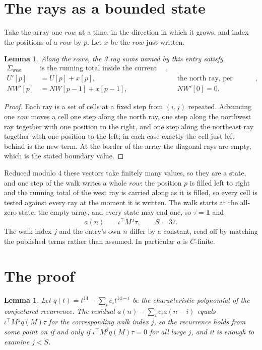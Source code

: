 \documentclass[11pt,a4paper]{article}
\theoremstyle{plain}
\newtheorem{lemma}[theorem]{Lemma}
\theoremstyle{definition}
\begin{document}
\section{The rays as a bounded state}

Take the array one $row$ at a time, in the direction in which it grows, and index the
positions of a $row $ by $p$. Let $x$ be the $row$ just written.

\begin{lemma}\label{lem:rays}
Along the $row$s, the 3 ray sums named by this entry satisfy
\[
\begin{aligned}
\Sigma_{\mathrm{west}}\ &\text{is the running total inside the current row},\\
U'[p]&=U[p]+x[p], &&\text{the north ray, per position},\\
NW'[p]&=NW[p-1]+x[p-1], && NW'[0]=0 .
\end{aligned}
\]
\end{lemma}

\begin{proof}
Each ray is a set of cells at a fixed step from $(i,j)$ repeated. Advancing one $row$
moves a cell one step along the north ray, one step along the northwest ray together with one
position to the right, and one step along the northeast ray together with one position to the
left; in each case exactly the cell just left behind is the new term. At the border of the
array the diagonal rays are empty, which is the stated boundary value.
\end{proof}

Reduced modulo $4$ these vectors take finitely many values, so they are a state, and one step
of the walk writes a whole $row$: the position $p$ is filled left to right and the
running total of the west ray is carried along as it is filled, so every cell is tested
against every ray at the moment it is written. The walk starts at the all-zero state, the empty
array, and every state may end one, so $\tau=\mathbf{1}$ and
\[
a(n)\;=\;\iota^{\!\top}M^{\,j}\tau ,\qquad S=37.
\]
The walk index $j$ and the entry's own $n$ differ by a constant, read off by matching the
published terms rather than assumed. In particular $a$ is $C$-finite.

\section{The proof}

\begin{lemma}\label{lem:crit}
Let $q(t)=t^{14}-\sum_i c_it^{14-i}$ be the characteristic polynomial of the
conjectured recurrence. The residual $a(n)-\sum_ic_ia(n-i)$ equals
$\iota^{\!\top}M^{\,j}q(M)\tau$ for the corresponding walk index $j$, so the recurrence
holds from some point on if and only if $\iota^{\!\top}M^{j}q(M)\tau=0$ for all large $j$,
and it is enough to examine $j<S$.
\end{lemma}
\end{document}
